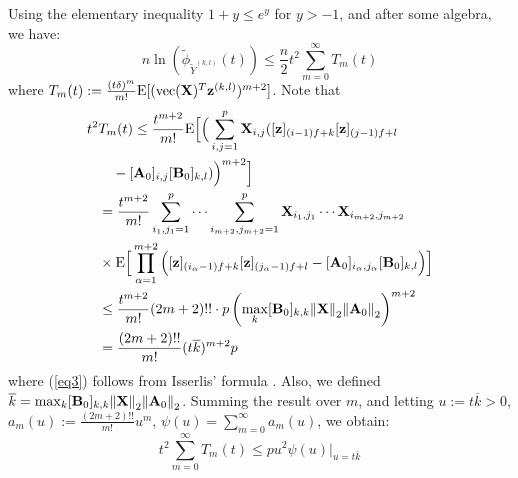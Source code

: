 \begin{IEEEproof}
Using the elementary inequality $1+y \leq e^{y}$ for $y>-1$, and after some algebra, we have:
\begin{equation} \label{eq_temp}
	n\ln(\tilde{\phi}_{\tilde{Y}^{(k,l)}}(t)) \leq \frac{n}{2} t^2 \sum_{m=0}^\infty{T_m(t)}
\end{equation}
where $T_m(t):=\frac{(t\delta)^m}{m!} {\rm E}[({ \text{vec} }({\mathbf{X}})^T { \mathbf{z} }^{(k,l)})^{m+2}]$. Note that
\begin{align}
	t^2 &T_m(t) \leq \frac{t^{m+2}}{m!} {\rm E}\Big[\Big(\sum_{i,j=1}^p {\mathbf{X}}_{i,j} ([{ \mathbf{z} }]_{(i-1)f+k}[{ \mathbf{z} }]_{(j-1)f+l} \nonumber \\
		&\quad -[{\mathbf{A}}_0]_{i,j}[{\mathbf{B}}_0]_{k,l})\Big)^{m+2}\Big] \nonumber \\
		&=\frac{t^{m+2}}{m!} \sum_{i_1,j_1=1}^p \cdots \sum_{i_{m+2},j_{m+2}=1}^p {\mathbf{X}}_{i_1,j_1} \cdots {\mathbf{X}}_{i_{m+2},j_{m+2}} \nonumber \\
		& \times {\rm E}\Big[ \prod_{\alpha=1}^{m+2} \Big( [{ \mathbf{z} }]_{(i_\alpha-1)f+k}[{ \mathbf{z} }]_{(j_\alpha-1)f+l} -[{\mathbf{A}}_0]_{i_\alpha,j_\alpha}[{\mathbf{B}}_0]_{k,l} \Big) \Big] \nonumber \\
		&\leq \frac{t^{m+2}}{m!} (2m+2)!! \cdot p \left( \max_k [{\mathbf{B}}_0]_{k,k} { \parallel }{\mathbf{X}}{ \parallel }_2 { \parallel }{\mathbf{A}}_0{ \parallel }_2 \right)^{m+2} \label{eq3} \\
		&= \frac{(2m+2)!!}{m!} (t \overline{k})^{m+2} p \nonumber
\end{align}
where (\ref{eq3}) follows from Isserlis' formula \cite{TsiligkaridisTSP}. Also, we defined $\overline{k}=\max_k [{\mathbf{B}}_0]_{k,k} { \parallel } {\mathbf{X}}{ \parallel }_2 { \parallel }{\mathbf{A}}_0{ \parallel }_2$. Summing the result over $m$, and letting $u:=t \overline{k}>0$, $a_m(u):= \frac{(2m+2)!!}{m!} u^m$, $\psi(u)=\sum_{m=0}^\infty a_m(u)$,  we obtain:
\begin{equation} \label{sum_bound}
	t^2 \sum_{m=0}^\infty{T_m(t)} \leq p u^2 \psi(u) \Big|_{u=t \overline{k}}
\end{equation}

\end{IEEEproof}

